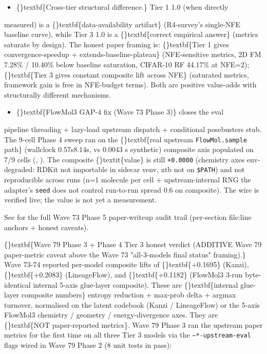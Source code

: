 \documentclass{article}
\begin{document}
\begin{itemize}
\item \{\}textbf\{Cross-tier structural difference.\} Tier 1 1.0 (when directly
\end{itemize}
measured) is a \{\}textbf\{data-availability artifact\} (R4-survey's single-NFE baseline curve), while Tier 3 1.0 is a \{\}textbf\{correct empirical answer\} (metrics saturate by design). The honest paper framing is: \{\}textbf\{Tier 1 gives convergence-speedup + extends-baseline-plateau\} (NFE-sensitive metrics, 2D FM 7.28\% / 10.40\% below baseline saturation, CIFAR-10 RF 44.17\% at NFE=2); \{\}textbf\{Tier 3 gives constant composite lift across NFE\} (saturated metrics, framework gain is free in NFE-budget terms). Both are positive value-adds with structurally different mechanisms.

\begin{itemize}
\item \{\}textbf\{FlowMol3 GAP-4 fix (Wave 73 Phase 3)\} closes the eval
\end{itemize}
pipeline  threading + lazy-load upstream dispatch + conditional posebusters stub. The 9-cell Phase 4 sweep ran on the \{\}textbf\{real upstream \texttt{FlowMol.sample} path\} (wallclock 0.57s8.14s, vs 0.0043 s synthetic)  composite axis populated on 7/9 cells (, ). The composite \{\}textit\{value\} is still \texttt{+0.0000} (chemistry axes env- degraded: RDKit not importable in sidecar venv, xtb not on \texttt{\$PATH}) and not reproducible across runs (n=1 molecule per cell + upstream-internal RNG the adapter's \texttt{seed} does not control  run-to-run spread 0.6 on composite). The wire is verified live; the value is not yet a measurement.

See  for the full Wave 73 Phase 5 paper-writeup audit trail (per-section file:line anchors + honest caveats).

\{\}textbf\{Wave 79 Phase 3 + Phase 4 Tier 3 honest verdict (ADDITIVE  Wave 79 paper-metric caveat above the Wave 73 "all-3-models final status" framing).\} Wave 73-74 reported per-model composite lifts of \{\}textbf\{+0.1695\} (Kanzi), \{\}textbf\{+0.2083\} (LineageFlow), and \{\}textbf\{+0.1182\} (FlowMol3 3-run byte-identical internal 5-axis glue-layer composite). These are \{\}textbf\{internal glue-layer composite numbers\}  entropy reduction + max-prob delta + argmax turnover, normalised on the latent codebook (Kanzi / LineageFlow) or the 5-axis FlowMol3 chemistry / geometry / energy-divergence axes. They are \{\}textbf\{NOT paper-reported metrics\}. Wave 79 Phase 3 ran the upstream paper metrics for the first time on all three Tier 3 models via the \texttt{--*-upstream-eval} flags wired in Wave 79 Phase 2 (8 unit tests in  pass):
\end{document}
